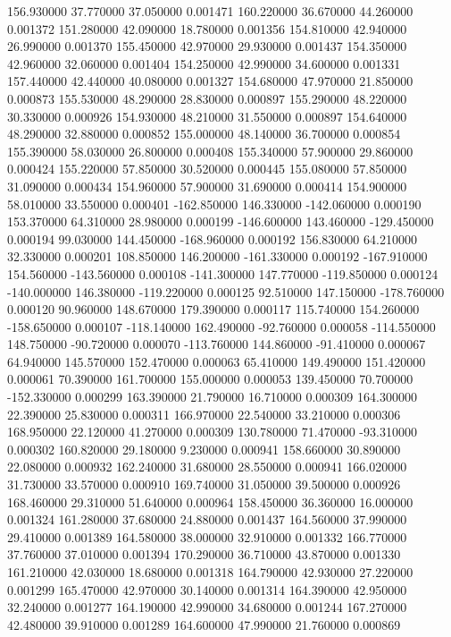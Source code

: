 156.930000 37.770000 37.050000 0.001471 
160.220000 36.670000 44.260000 0.001372 
151.280000 42.090000 18.780000 0.001356 
154.810000 42.940000 26.990000 0.001370 
155.450000 42.970000 29.930000 0.001437 
154.350000 42.960000 32.060000 0.001404 
154.250000 42.990000 34.600000 0.001331 
157.440000 42.440000 40.080000 0.001327 
154.680000 47.970000 21.850000 0.000873 
155.530000 48.290000 28.830000 0.000897 
155.290000 48.220000 30.330000 0.000926 
154.930000 48.210000 31.550000 0.000897 
154.640000 48.290000 32.880000 0.000852 
155.000000 48.140000 36.700000 0.000854 
155.390000 58.030000 26.800000 0.000408 
155.340000 57.900000 29.860000 0.000424 
155.220000 57.850000 30.520000 0.000445 
155.080000 57.850000 31.090000 0.000434 
154.960000 57.900000 31.690000 0.000414 
154.900000 58.010000 33.550000 0.000401 
-162.850000 146.330000 -142.060000 0.000190 
153.370000 64.310000 28.980000 0.000199 
-146.600000 143.460000 -129.450000 0.000194 
99.030000 144.450000 -168.960000 0.000192 
156.830000 64.210000 32.330000 0.000201 
108.850000 146.200000 -161.330000 0.000192 
-167.910000 154.560000 -143.560000 0.000108 
-141.300000 147.770000 -119.850000 0.000124 
-140.000000 146.380000 -119.220000 0.000125 
92.510000 147.150000 -178.760000 0.000120 
90.960000 148.670000 179.390000 0.000117 
115.740000 154.260000 -158.650000 0.000107 
-118.140000 162.490000 -92.760000 0.000058 
-114.550000 148.750000 -90.720000 0.000070 
-113.760000 144.860000 -91.410000 0.000067 
64.940000 145.570000 152.470000 0.000063 
65.410000 149.490000 151.420000 0.000061 
70.390000 161.700000 155.000000 0.000053 
139.450000 70.700000 -152.330000 0.000299 
163.390000 21.790000 16.710000 0.000309 
164.300000 22.390000 25.830000 0.000311 
166.970000 22.540000 33.210000 0.000306 
168.950000 22.120000 41.270000 0.000309 
130.780000 71.470000 -93.310000 0.000302 
160.820000 29.180000 9.230000 0.000941 
158.660000 30.890000 22.080000 0.000932 
162.240000 31.680000 28.550000 0.000941 
166.020000 31.730000 33.570000 0.000910 
169.740000 31.050000 39.500000 0.000926 
168.460000 29.310000 51.640000 0.000964 
158.450000 36.360000 16.000000 0.001324 
161.280000 37.680000 24.880000 0.001437 
164.560000 37.990000 29.410000 0.001389 
164.580000 38.000000 32.910000 0.001332 
166.770000 37.760000 37.010000 0.001394 
170.290000 36.710000 43.870000 0.001330 
161.210000 42.030000 18.680000 0.001318 
164.790000 42.930000 27.220000 0.001299 
165.470000 42.970000 30.140000 0.001314 
164.390000 42.950000 32.240000 0.001277 
164.190000 42.990000 34.680000 0.001244 
167.270000 42.480000 39.910000 0.001289 
164.600000 47.990000 21.760000 0.000869 
